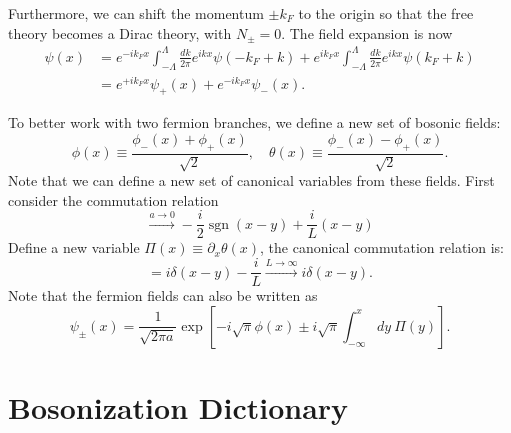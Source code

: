 \documentclass[aps,prb,superscriptaddress,nofootinbib]{revtex4}
\begin{document}
Furthermore, we can shift the momentum $\pm k_F$ to the origin so that the free theory becomes a Dirac theory, with $N_{\pm}=0$.
The field expansion is now
\begin{equation}
\begin{aligned}
	\psi(x) &= e^{-ik_Fx} \int_{-\Lambda}^\Lambda \frac{dk}{2\pi} e^{ikx} \psi(-k_F+k)
	+ e^{ik_Fx} \int_{-\Lambda}^\Lambda \frac{dk}{2\pi} e^{ikx} \psi(k_F+k) \\
	&= e^{+ik_F x}\psi_+(x) + e^{-ik_F x}\psi_-(x).
\end{aligned}
\end{equation}

To better work with two fermion branches, we define a new set of bosonic fields:
\begin{equation}
	\phi(x) \equiv \frac{\phi_-(x) + \phi_+(x)}{\sqrt 2}, \quad
	\theta(x) \equiv \frac{\phi_-(x) - \phi_+(x)}{\sqrt 2}.
\end{equation}
Note that we can define a new set of canonical variables from these fields.
First consider the commutation relation
\begin{equation}
	[\phi(x),\theta(y)] \stackrel{ a \rightarrow 0}{\longrightarrow} 
		-\frac{i}{2} \operatorname{sgn}(x-y) + \frac{i}{L}(x-y)
\end{equation}
Define a new variable $\Pi(x) \equiv \partial_x\theta(x)$, the canonical commutation relation is:
\begin{equation}
	[\phi(x), \Pi(y)] = i \delta(x-y) - \frac{i}{L} \stackrel{L \rightarrow \infty}{\longrightarrow} i\delta(x-y).
\end{equation}
Note that the fermion fields can also be written as
\begin{equation}
	\psi_{\pm}(x) = \frac{1}{\sqrt{2\pi a}} \exp\left[-i\sqrt{\pi} \phi(x) \pm i\sqrt{\pi} \int^x_{-\infty} dy\ \Pi(y) \right].
\end{equation}


\section{Bosonization Dictionary}
\end{document}
